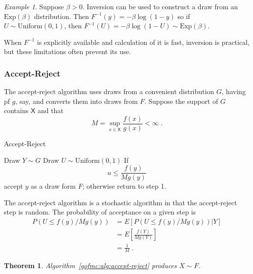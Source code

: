 \documentclass[12pt]{article}
\theoremstyle{plain}
\newtheorem{thm}{Theorem}[section]
\theoremstyle{definition}
\theoremstyle{remark}
\newtheorem{example}{Example}[section]
\newcommand{\sX}{\mathsf{X}}
\begin{document}
\begin{example}
  Suppose $\beta > 0$.  Inversion can be used to construct a draw from
  an $\text{Exp}(\beta)$ distribution.  Then $F^{-1}(y) = -\beta
  \log(1-y)$ so if $U \sim \text{Uniform}(0,1)$, then $F^{-1}(U) =
  -\beta \log(1-U) \sim \text{Exp}(\beta)$.
\end{example}

When $F^{-1}$ is explicitly available and calculation of it is fast,
inversion is practical, but these limitations often prevent its use.

\subsubsection{Accept-Reject}
The accept-reject algorithm uses draws from a convenient distribution
$G$, having pf $g$, say, and converts them into draws from $F$.
Suppose the support of $G$ contains $\sX$ and that
\[
M = \sup_{x \in \sX} \frac{f(x)}{g(x)}< \infty \; .
\]

\begin{algorithm}[H]
 \caption{Accept-Reject} \label{gofmc:alg:accept-reject}
 \begin{algorithmic}[1]
 \State Draw $Y \sim G$
 \State Draw $U \sim \text{Uniform}(0,1)$
 \State If
 \[
u \le \frac{f(y)}{M g(y)}
 \]
accept $y$ as a draw form $F$; otherwise return to step 1.   
 \end{algorithmic}
\end{algorithm}

The accept-reject algorithm is a stochastic algorithm in that
the accept-reject step is random.  The probability of acceptance on a 
given step is
\begin{align*}
P( U \le f(y) / M g(y)) & = E \left[P( U \le f(y) / M g(y)) | Y \right]\\
& = E \left[ \frac{f(Y)}{Mg(Y)} \right]\\
& = \frac{1}{M} \; .
\end{align*}

\begin{thm} \label{gofmc:thm:accept-reject}
Algorithm~\ref{gofmc:alg:accept-reject} produces $X \sim F$.
\end{thm}
\end{document}
